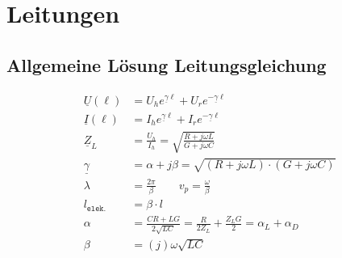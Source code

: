 \section{Leitungen}
\subsection{Allgemeine Lösung Leitungsgleichung}
\begin{align*}
    \underline{U}(\ell)  & = U_h e^{\underline{\gamma} \ell} + U_r e^{-\underline{\gamma} \ell} \\
    \underline{I}(\ell)  & = I_h e^{\underline{\gamma} \ell} + I_r e^{-\underline{\gamma} \ell} \\
    \underline{Z}_L     & = \frac{U_h}{I_h} = \sqrt{ \frac{R + j \omega L}{G + j \omega C}}                                                                                   \\
    \underline{\gamma}  & = \alpha + j\beta = \sqrt{(R+j\omega L)\cdot(G+j\omega C)}                                                                                                            \\
    \lambda             & = \frac{2 \pi}{\beta} \qquad v_p = \frac{\omega}{\beta} \\
    l_\texttt{elek.}    & = \beta \cdot l                                                                                                                                     \\
    \alpha              & = \frac{C R+L G}{2 \sqrt{L C}}=\frac{R}{2 Z_L}+\frac{Z_L G}{2}=\alpha_L+\alpha_D \\
    \beta               & = (j) \omega \sqrt{L C}
\end{align*}
